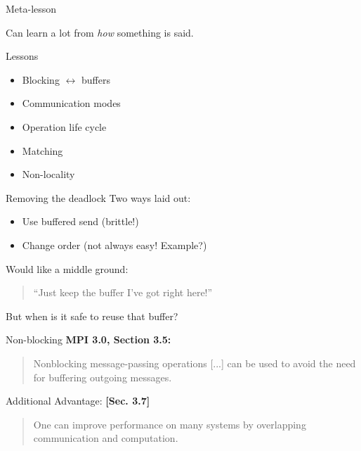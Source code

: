 \documentclass[english,compress]{beamer}
\begin{document}
\begin{frame}{Meta-lesson}
  \begin{center}
    \Large
    Can learn a lot from \emph{how} something is said.
  \end{center}
\end{frame}
\begin{frame}{Lessons}
  \begin{itemize}
    \item Blocking $\leftrightarrow$ buffers
    \item Communication modes
    \item Operation life cycle
    \item Matching
    \item Non-locality
  \end{itemize}
\end{frame}
\begin{frame}{Removing the deadlock}
  Two ways laid out:
  \pause
  \begin{itemize}
    \item Use buffered send (brittle!)
    \item Change order (not always easy! Example?)
  \end{itemize}
  \pause
  \bigskip
  Would like a middle ground:
  \begin{quote}
  ``Just keep the buffer I've got right here!''
  \end{quote}
  But when is it safe to reuse that buffer?
\end{frame}
\begin{frame}{Non-blocking}
  \textbf{MPI 3.0, Section 3.5:}
  \begin{quote}
    \upshape
    Nonblocking message-passing operations [...] can be used to avoid
    the need for buffering outgoing messages.
  \end{quote}
  Additional Advantage: \textbf{[Sec. 3.7]}
  \begin{quote}
    \upshape
    One can improve performance on many systems by overlapping
    communication and computation.
  \end{quote}
  \uncover<+>{}
\end{frame}
\end{document}
